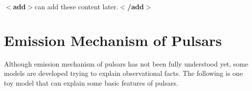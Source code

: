 \documentclass[12pt]{report}
\newcommand{\add}[1]{
  $<$\textbf{add}$>$#1$<$\textbf{/add}$>$
}
\begin{document}
        \add{can add these content later.}


    \section{Emission Mechanism of Pulsars}
            Although emission mechanism of pulsars has not been fully understood yet, some models are developed 
            trying to 
            explain observational facts. The following is one toy model that can explain some basic features of 
            pulsars.
       
\end{document}
